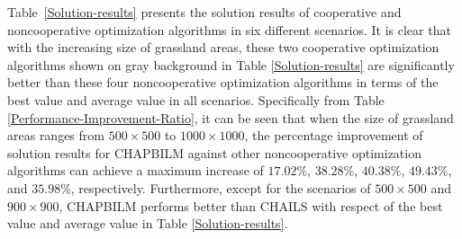 \documentclass[preprint,5pt]{elsarticle}
\begin{document}
Table~\ref{Solution-results} presents the solution results of cooperative and noncooperative optimization algorithms in six different scenarios. It is clear that with the increasing size of grassland areas, these two cooperative optimization algorithms shown on gray background in Table \ref{Solution-results} are significantly better than these four noncooperative optimization algorithms in terms of the best value and average value in all scenarios. Specifically from Table \ref{Performance-Improvement-Ratio}, it can be seen that when the size of grassland areas ranges from $500 \times 500$ to $1000 \times 1000$, the percentage improvement of solution results for CHAPBILM against other noncooperative optimization algorithms can achieve a maximum increase of $17.02\%$, $38.28\%$, $40.38\%$, $49.43\%$, and $35.98\%$, respectively.
Furthermore, except for the scenarios of $500\times 500$ and $900\times 900$, CHAPBILM performs better than CHAILS with respect of the best value and average value in Table \ref{Solution-results}.
\end{document}
